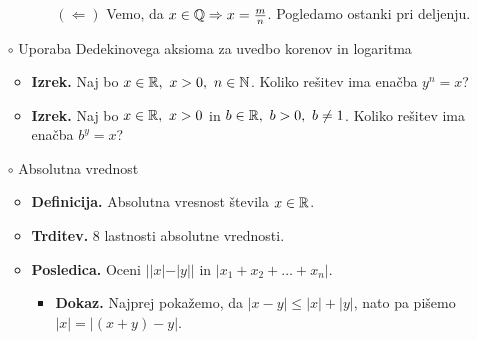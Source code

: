 \begin{enumerate}
\begin{itemize}
\begin{itemize}
            $(\Leftarrow)$ Vemo, da $x \in \mathbb{Q} \Rightarrow x = \frac{m}{n}$. Pogledamo ostanki pri deljenju.
        \end{itemize}
    \end{itemize}

    \item[$\circ$] Uporaba Dedekinovega aksioma za uvedbo korenov in logaritma
    \begin{itemize}
        \item \colorbox{blue!30}{\textbf{Izrek.}} Naj bo $x \in \mathbb{R}, \ x>0,\ n \in \mathbb{N}$. Koliko rešitev ima enačba $y^n = x$?
        \item \colorbox{blue!30}{\textbf{Izrek.}} Naj bo $x \in \mathbb{R}, \ x>0$ in $b \in \mathbb{R}, \ b>0, \ b \neq 1$. Koliko rešitev ima enačba $b^y = x$?
    \end{itemize}

    \item[$\circ$] Absolutna vrednost
    \begin{itemize}
        \item \colorbox{purple!30}{\textbf{Definicija.}} Absolutna vresnost števila $x \in \mathbb{R}$.
        \item \colorbox{blue!30}{\textbf{Trditev.}} 8 lastnosti absolutne vrednosti.
        \item \colorbox{orange!30}{\textbf{Posledica.}} Oceni $||x|-|y||$ in $|x_1 + x_2 + \ldots + x_n|$.
        \begin{itemize}
            \item \colorbox{green!30}{\textbf{Dokaz.}} Najprej pokažemo, da $|x-y| \leq |x| + |y|$, nato pa pišemo $|x| = |(x+y) - y|$.
        \end{itemize}
    \end{itemize}


\end{enumerate}
